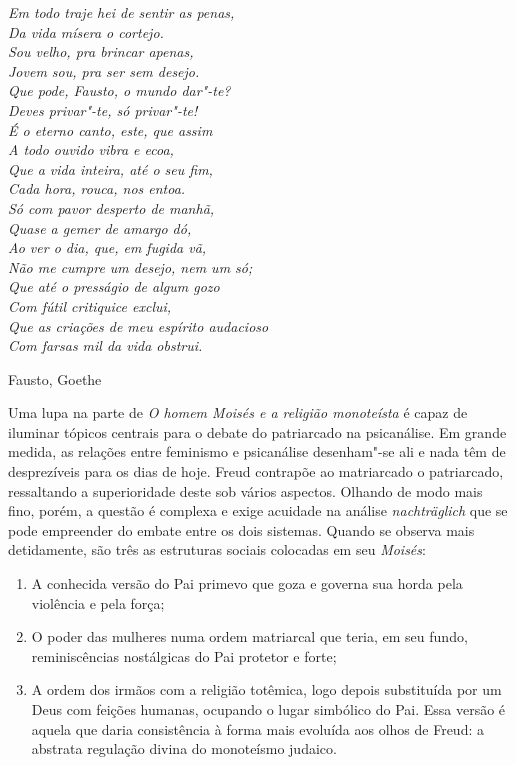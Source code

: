 \epigraph{\emph{Em todo traje hei de sentir as penas,\\
Da vida mísera o cortejo.\\
Sou velho, pra brincar apenas,\\
Jovem sou, pra ser sem desejo.\\
Que pode, Fausto, o mundo dar"-te?\\
Deves privar"-te, só privar"-te!\\
É o eterno canto, este, que assim\\
A todo ouvido vibra e ecoa,\\
Que a vida inteira, até o seu fim,\\
Cada hora, rouca, nos entoa.\\
Só com pavor desperto de manhã,\\
Quase a gemer de amargo dó,\\
Ao ver o dia, que, em fugida vã,\\
Não me cumpre um desejo, nem um só;\\
Que até o presságio de algum gozo\\
Com fútil critiquice exclui,\\
Que as criações de meu espírito audacioso\\
Com farsas mil da vida obstrui.}}{Fausto, Goethe}

Uma lupa na parte  de \emph{O homem Moisés e a religião monoteísta} é
capaz de iluminar tópicos centrais para o debate do patriarcado na
psicanálise. Em grande medida, as relações entre feminismo e psicanálise
desenham"-se ali e nada têm de desprezíveis para os dias de hoje. Freud
contrapõe ao matriarcado o patriarcado, ressaltando a superioridade
deste sob vários aspectos. Olhando de modo mais fino, porém, a questão é
complexa e exige acuidade na análise \emph{nachträglich} que se pode
empreender do embate entre os dois sistemas. Quando se observa mais
detidamente, são três as estruturas sociais colocadas em seu
\emph{Moisés}:

\begin{enumerate}
\def\labelenumi{\arabic{enumi})}
\item
  A conhecida versão do Pai primevo que goza e governa sua horda pela
  violência e pela força;
\item
  O poder das mulheres numa ordem matriarcal que teria, em seu fundo,
  reminiscências nostálgicas do Pai protetor e forte;
\item
  A ordem dos irmãos com a religião totêmica, logo depois substituída
  por um Deus com feições humanas, ocupando o lugar simbólico do Pai.
  Essa versão é aquela que daria consistência à forma mais evoluída aos
  olhos de Freud: a abstrata regulação divina do monoteísmo judaico.
\end{enumerate}

